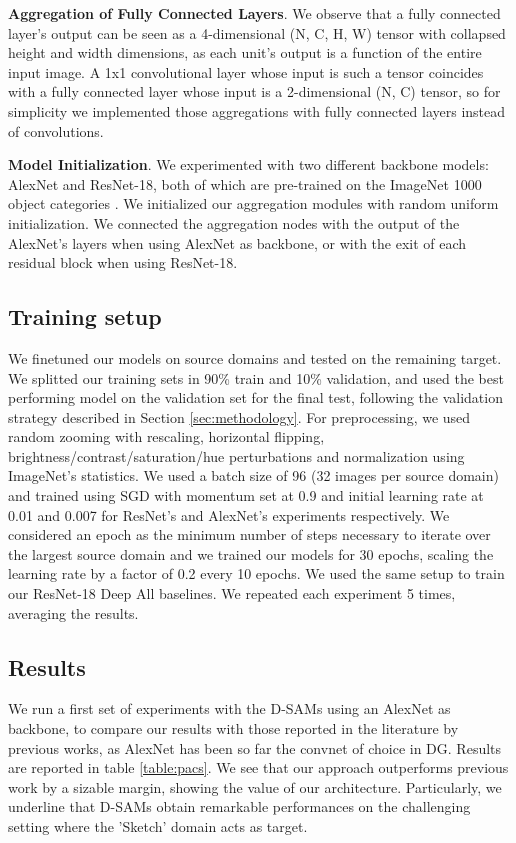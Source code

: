     \textbf{Aggregation of Fully Connected Layers}. We observe that a fully connected layer's output can be seen as a 4-dimensional (N, C, H, W) tensor with collapsed height and width dimensions, as each unit's output is a function of the entire input image. A 1x1 convolutional layer whose input is such a tensor coincides with a fully connected layer whose input is a 2-dimensional (N, C) tensor, so for simplicity we implemented those aggregations with fully connected layers instead of convolutions.
    
    \textbf{Model Initialization}. We experimented with two different backbone models: AlexNet and ResNet-18, both of which are pre-trained on the ImageNet 1000 object categories \cite{ILSVRC15}. We initialized our aggregation modules   with random uniform initialization. We connected the aggregation nodes with the output of the AlexNet's layers when using AlexNet as backbone, or with the exit of each residual block when using ResNet-18. 
    
    \subsection{Training setup}
    \label{sec:training}
    We finetuned our models on  source domains and tested on the remaining target. We splitted our training sets in 90\% train and 10\% validation, and used the best performing model on the validation set for the final test, following the validation strategy described in Section \ref{sec:methodology}. For preprocessing, we used random zooming with rescaling, horizontal flipping, brightness/contrast/saturation/hue perturbations and normalization using ImageNet's statistics. We used a batch size of 96 (32 images per source domain) and trained using SGD with momentum set at 0.9 and initial learning rate at 0.01 and 0.007 for ResNet's and AlexNet's experiments respectively. We considered an epoch as the minimum number of steps necessary to iterate over the largest source domain and we trained our models for 30 epochs, scaling the learning rate by a factor of 0.2 every 10 epochs. We used the same setup to train our ResNet-18 Deep All baselines. We repeated each experiment 5 times, averaging the results.
    
    \subsection{Results}
    \label{sec:results}
    
    We run a first set of experiments with the D-SAMs using an AlexNet as backbone, to compare our results with those reported in the literature by previous works, as AlexNet has been so far the convnet of choice in DG. Results are reported in table \ref{table:pacs}. We see that our approach outperforms previous work by a sizable margin, showing the value of our architecture. Particularly, we underline that D-SAMs obtain remarkable performances on the challenging setting where the 'Sketch' domain acts as target.
    
